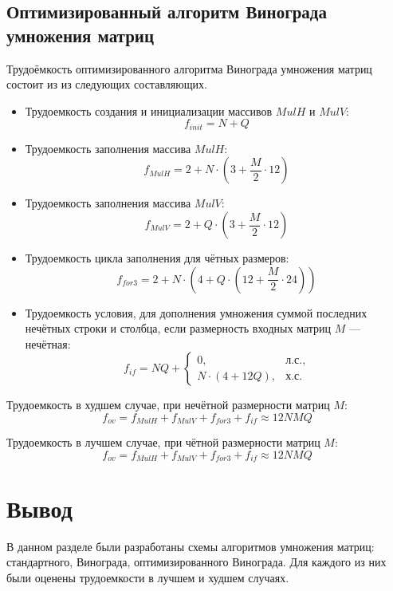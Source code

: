 \subsection{Оптимизированный алгоритм Винограда умножения матриц}

Трудоёмкость оптимизированного алгоритма Винограда умножения матриц состоит из из следующих составляющих.
\begin{itemize}
	\item Трудоемкость создания и инициализации массивов $MulH$ и $MulV$:
	\begin{equation}
		\label{for:impr_init}
		f_{init} = N + Q
	\end{equation}
	
	\item Трудоемкость заполнения массива $MulH$:
	\begin{equation}
		\label{for:impr_MulH}
		f_{MulH} = 2 + N \cdot (3 + \frac{M}{2} \cdot 12)
	\end{equation}
	
	\item Трудоемкость заполнения массива $MulV$:
	\begin{equation}
		\label{for:impr_MulV}
		f_{MulV} = 2 + Q \cdot (3 + \frac{M}{2} \cdot 12)
	\end{equation}
	
	\item Трудоемкость цикла заполнения для чётных размеров:
	\begin{equation}
		\label{for:impr_cycle}
		f_{for3} = 2 + N \cdot (4 + Q \cdot (12 + \frac{M}{2} \cdot 24))
	\end{equation}
	
	\item Трудоемкость условия, для дополнения умножения суммой последних нечётных строки и столбца, если размерность входных матриц $M$ --- нечётная:
	\begin{equation}
		\label{for:if}
		f_{if} = NQ +
		\begin{cases}
			0, & \text{л.с.,}\\
			N \cdot (4 + 12Q), & \text{х.с.}
		\end{cases}
	\end{equation}
\end{itemize}

Трудоемкость в худшем случае, при нечётной размерности матриц $M$:
\begin{equation}
	\label{for:bad_impr}
	f_{ov} = f_{MulH} + f_{MulV} + f_{for3} + f_{if} \approx 12NMQ
\end{equation}

Трудоемкость в лучшем случае, при чётной размерности матриц $M$:
\begin{equation}
	\label{for:good_impr}
	f_{ov} = f_{MulH} + f_{MulV} + f_{for3} + f_{if} \approx 12NMQ
\end{equation}

\section*{Вывод}

В данном разделе были разработаны схемы алгоритмов умножения матриц: стандартного, Винограда, оптимизированного Винограда. Для каждого из них были оценены трудоемкости в лучшем и худшем случаях.